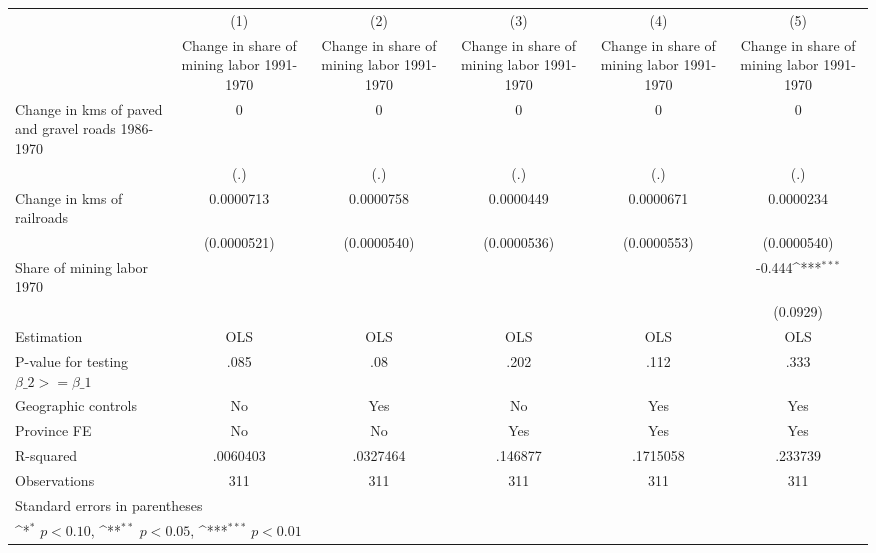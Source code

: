 {
\def\sym#1{\ifmmode^{#1}\else\(^{#1}\)\fi}
\begin{tabular}{l*{5}{c}}
\hline\hline
                    &\multicolumn{1}{c}{(1)}&\multicolumn{1}{c}{(2)}&\multicolumn{1}{c}{(3)}&\multicolumn{1}{c}{(4)}&\multicolumn{1}{c}{(5)}\\
                    &\multicolumn{1}{c}{Change in share of mining labor 1991-1970}&\multicolumn{1}{c}{Change in share of mining labor 1991-1970}&\multicolumn{1}{c}{Change in share of mining labor 1991-1970}&\multicolumn{1}{c}{Change in share of mining labor 1991-1970}&\multicolumn{1}{c}{Change in share of mining labor 1991-1970}\\
\hline
Change in kms of paved and gravel roads 1986-1970&           0         &           0         &           0         &           0         &           0         \\
                    &         (.)         &         (.)         &         (.)         &         (.)         &         (.)         \\
[1em]
Change in kms of railroads&   0.0000713         &   0.0000758         &   0.0000449         &   0.0000671         &   0.0000234         \\
                    & (0.0000521)         & (0.0000540)         & (0.0000536)         & (0.0000553)         & (0.0000540)         \\
[1em]
Share of mining labor 1970&                     &                     &                     &                     &      -0.444\sym{***}\\
                    &                     &                     &                     &                     &    (0.0929)         \\
\hline
Estimation          &         OLS         &         OLS         &         OLS         &         OLS         &         OLS         \\
P-value for testing $\beta\_2 >= \beta\_1$&        .085         &         .08         &        .202         &        .112         &        .333         \\
Geographic controls &          No         &         Yes         &          No         &         Yes         &         Yes         \\
Province FE         &          No         &          No         &         Yes         &         Yes         &         Yes         \\
R-squared           &    .0060403         &    .0327464         &     .146877         &    .1715058         &     .233739         \\
Observations        &         311         &         311         &         311         &         311         &         311         \\
\hline\hline
\multicolumn{6}{l}{\footnotesize Standard errors in parentheses}\\
\multicolumn{6}{l}{\footnotesize \sym{*} \(p<0.10\), \sym{**} \(p<0.05\), \sym{***} \(p<0.01\)}\\
\end{tabular}
}
